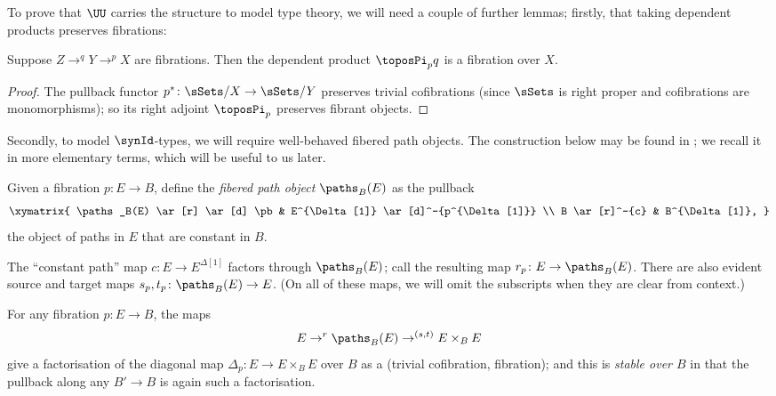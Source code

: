 To prove that $\UU$ carries the structure to model type theory, we will need a couple of further lemmas; firstly, that taking dependent products preserves fibrations:

\begin{lemma} \label{lemma:dep-prod-of-fibs}
Suppose $Z \to^q Y \to^p X$ are fibrations.  Then the dependent product $\toposPi_p q$ is a fibration over $X$.
\end{lemma}

\begin{proof}
The pullback functor $p^* \colon \sSets/X \to \sSets/Y$ preserves trivial cofibrations (since $\sSets$ is right proper and cofibrations are monomorphisms); so its right adjoint $\toposPi_p$ preserves fibrant objects.
\end{proof}

Secondly, to model $\synId$-types, we will require well-behaved fibered path objects.  The construction below may be found in \cite[Thm.~2.25]{warren:thesis}; we recall it in more elementary terms, which will be useful to us later.

\begin{definition}
Given a fibration $p \colon E \to B$, define the \emph{fibered path object} $\paths_B(E)$ as the pullback
\[\xymatrix{
  \paths_B(E) \ar[r] \ar[d] \pb & E^{\Delta[1]} \ar[d]^-{p^{\Delta[1]}} \\
  B \ar[r]^-{c} & B^{\Delta[1]},
}\]
the object of paths in $E$ that are constant in $B$.

The “constant path” map $c \colon E \to E^{\Delta[1]}$ factors through $\paths_B(E)$; call the resulting map $r_p \colon E \to \paths_B(E)$.  There are also evident source and target maps $s_p,t_p \colon \paths_B(E) \to E$.  (On all of these maps, we will omit the subscripts when they are clear from context.)
\end{definition}

\begin{proposition} \label{prop:stable-fibered-path-obs}
For any fibration $p \colon E \to B$, the maps 
\[E \to^r \paths_B(E) \to^{(s,t)} E \times_B E\]
give a factorisation of the diagonal map $\Delta_p \colon E \to E \times_B E$ over $B$ as a (trivial cofibration, fibration); and this is \emph{stable over $B$} in that the pullback along any $B' \to B$ is again such a factorisation. 
\end{proposition}

